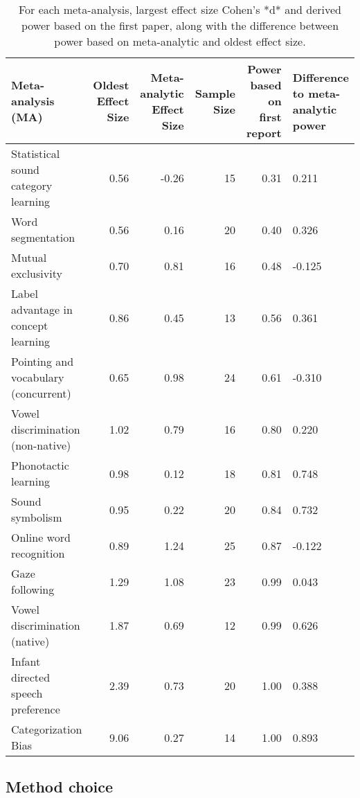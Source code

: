 \documentclass[english,floatsintext,man]{apa6}
\begin{document}
\begin{table}[tbp]
\begin{center}
\begin{threeparttable}
\caption{For each meta-analysis, largest effect size Cohen's *d* and derived power based on the first paper, along with the difference between power based on meta-analytic and oldest effect size.}
\begin{tabular}{lrrrrl}
\toprule
Meta-analysis (MA) & Oldest Effect Size & Meta-analytic Effect Size & Sample Size & Power based on 
 first report & Difference to
 meta-analytic power\\
\midrule
Statistical sound category learning & 0.56 & -0.26 & 15 & 0.31 & 0.211\\
Word segmentation & 0.56 & 0.16 & 20 & 0.40 & 0.326\\
Mutual exclusivity & 0.70 & 0.81 & 16 & 0.48 & -0.125\\
Label advantage in concept learning & 0.86 & 0.45 & 13 & 0.56 & 0.361\\
Pointing and vocabulary (concurrent) & 0.65 & 0.98 & 24 & 0.61 & -0.310\\
Vowel discrimination (non-native) & 1.02 & 0.79 & 16 & 0.80 & 0.220\\
Phonotactic learning & 0.98 & 0.12 & 18 & 0.81 & 0.748\\
Sound symbolism & 0.95 & 0.22 & 20 & 0.84 & 0.732\\
Online word recognition & 0.89 & 1.24 & 25 & 0.87 & -0.122\\
Gaze following & 1.29 & 1.08 & 23 & 0.99 & 0.043\\
Vowel discrimination (native) & 1.87 & 0.69 & 12 & 0.99 & 0.626\\
Infant directed speech preference & 2.39 & 0.73 & 20 & 1.00 & 0.388\\
Categorization Bias & 9.06 & 0.27 & 14 & 1.00 & 0.893\\
\bottomrule
\end{tabular}
\end{threeparttable}
\end{center}
\end{table}

\subsection{Method choice}\label{method-choice-1}
\end{document}
